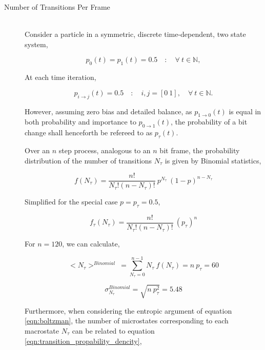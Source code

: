 	
	\begin{description}
		\item[Number of Transitions Per Frame] \hfill \\
			
			Consider a particle in a symmetric, discrete time-dependent, two state system,

			\begin{equation}
				p_0(t) = p_1(t) = 0.5 \quad : \quad \forall\ t \in \mathbb{N},
			\end{equation}

			At each time iteration,

			\begin{equation}
				p_{i \to j}(t) = 0.5 \quad : \quad i,j = [0\ 1], \quad \forall\ t \in \mathbb{N}.
			\end{equation}

			However, assuming zero bias and detailed balance, as $p_{1 \to 0}(t)$ is equal in both probability and importance to $p_{0 \to 1}(t)$, the probability of a bit change shall henceforth be refereed to as $p_{\tau}(t)$.
			\par
			Over an $n$ step process, analogous to an $n$ bit frame, the probability distribution of the number of transitions $N_\tau$ is given by Binomial statistics,

			\begin{equation}
				f(N_{\tau}) = \frac{n!}{N_{\tau}!(n-N_{\tau})!}\ p^{N_{\tau}}\ (1 - p)^{n-N_{\tau}}
			\end{equation}

			Simplified for the special case $p = p_{\tau} = 0.5$,

			\begin{equation}
				f_{\tau}(N_{\tau}) = \frac{n!}{N_{\tau}!(n-N_{\tau})!}\ (p_{\tau})^{n}
				\label{eqn:transition_propability_dencity}
			\end{equation}

			For $n = 120$, we can calculate,

			\begin{equation}
				<N_\tau>^{Binomial} \ = \sum_{N_{\tau}=0}^{n-1} N_{\tau}\ f(N_{\tau}) = n\ p_{\tau} = 60
				\label{eqn:tansition_expectation}
			\end{equation}

			\begin{equation}
				\sigma_{N_\tau}^{Binomial} = \sqrt{ n\ p_{\tau}^2} = 5.48
			\end{equation}

			Furthermore, when considering the entropic argument of equation \ref{eqn:boltzman}, the number of microstates corresponding to each macrostate $N_\tau$ can be related to equation \ref{eqn:transition_propability_dencity},


\end{description}
